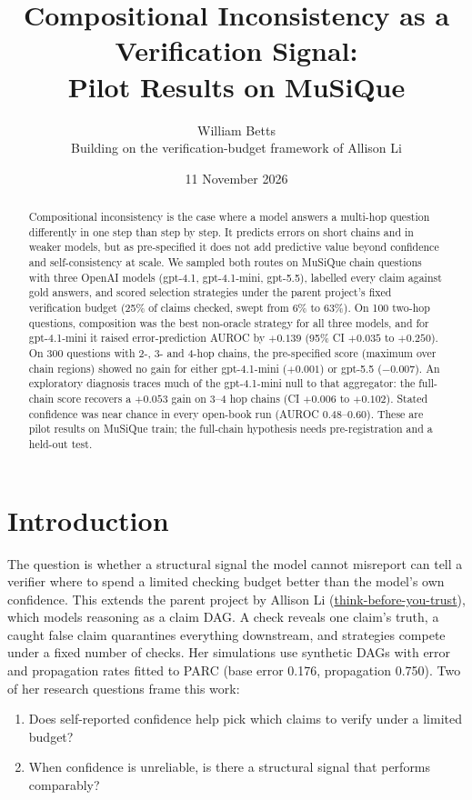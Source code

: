 \documentclass[11pt]{article}
\title{Compositional Inconsistency as a Verification Signal:\\Pilot Results on MuSiQue}
\author{William Betts\\[2pt]\small Building on the verification-budget framework of Allison Li}
\date{11 November 2026}
\begin{document}
\maketitle

\begin{abstract}
Compositional inconsistency is the case where a model answers a multi-hop question
differently in one step than step by step. It predicts errors on short chains and in
weaker models, but as pre-specified it does not add predictive value beyond confidence and
self-consistency at scale. We sampled both routes on MuSiQue chain questions with three
OpenAI models (gpt-4.1, gpt-4.1-mini, gpt-5.5), labelled every claim against gold answers,
and scored selection strategies under the parent project's fixed verification budget (25\%
of claims checked, swept from 6\% to 63\%). On 100 two-hop questions, composition was the
best non-oracle strategy for all three models, and for gpt-4.1-mini it raised
error-prediction AUROC by $+0.139$ (95\% CI $+0.035$ to $+0.250$). On 300 questions with
2-, 3- and 4-hop chains, the pre-specified score (maximum over chain regions) showed no gain
for either gpt-4.1-mini ($+0.001$) or gpt-5.5 ($-0.007$). An exploratory diagnosis traces
much of the gpt-4.1-mini null to that aggregator: the full-chain score recovers a $+0.053$
gain on 3--4 hop chains (CI $+0.006$ to $+0.102$). Stated confidence was near chance in
every open-book run (AUROC 0.48--0.60). These are pilot results on MuSiQue train; the
full-chain hypothesis needs pre-registration and a held-out test.
\end{abstract}

\section{Introduction}

The question is whether a structural signal the model cannot misreport can tell a verifier
where to spend a limited checking budget better than the model's own confidence. This
extends the parent project by Allison Li
(\href{https://github.com/allison324/think-before-you-trust}{think-before-you-trust}), which
models reasoning as a claim DAG. A check reveals one claim's truth, a caught false claim
quarantines everything downstream, and strategies compete under a fixed number of checks.
Her simulations use synthetic DAGs with error and propagation rates fitted to PARC (base
error 0.176, propagation 0.750). Two of her research questions frame this work:
\begin{enumerate}
  \item Does self-reported confidence help pick which claims to verify under a limited budget?
  \item When confidence is unreliable, is there a structural signal that performs comparably?
\end{enumerate}
\end{document}
